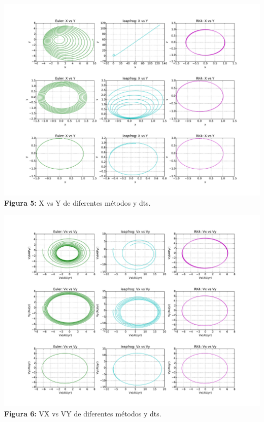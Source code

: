 \documentclass[11pt,letterpaper]{exam}
\begin{document}
\begin{center}
\includegraphics[width=16.cm]{XY_met_dt.pdf}
\textbf{Figura 5:}{  X vs Y de diferentes m\'etodos y dts.}
\end{center}

\begin{center}
\includegraphics[width=16.cm]{VxVy_met_dt.pdf}
\textbf{Figura 6:}{  VX vs VY de diferentes m\'etodos y dts.}
\end{center}
\end{document}
